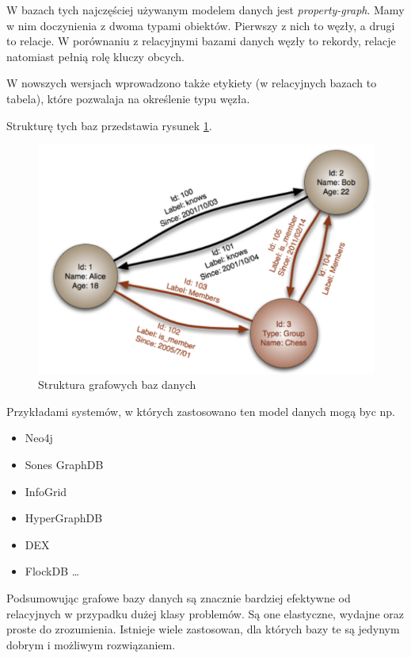 \documentclass[10pt,twocolumn]{llncs}          %
\begin{document}
W bazach tych najczęściej używanym modelem danych jest \emph{property-graph}. Mamy w nim doczynienia z dwoma typami obiektów. Pierwszy z nich to węzły, a drugi to relacje. W porównaniu z relacyjnymi bazami danych węzły to rekordy, relacje natomiast pełnią rolę kluczy obcych.

W nowszych wersjach wprowadzono także etykiety (w relacyjnych bazach to tabela), które pozwalaja na określenie typu węzła. 

Strukturę tych baz przedstawia rysunek \ref{fig:grafowe_bazy}.

\begin{figure}
    \centerline{\includegraphics[scale=0.6]{obrazki/grafowe_bazy.png}}
    \caption{Struktura grafowych baz danych}
    \label{fig:grafowe_bazy}       %
\end{figure}

Przykładami systemów, w których zastosowano ten model danych mogą byc np.
\begin{itemize}
    \item Neo4j
    \item Sones GraphDB
    \item InfoGrid
    \item HyperGraphDB
    \item DEX
    \item FlockDB \ldots
\end{itemize}

Podsumowując grafowe bazy danych są znacznie bardziej efektywne od relacyjnych w przypadku dużej klasy problemów. Są one elastyczne, wydajne oraz proste do zrozumienia. Istnieje wiele zastosowan, dla których bazy te są jedynym dobrym i możliwym rozwiązaniem.
\end{document}
